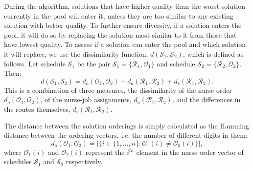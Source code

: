 \documentclass[a4paper,11pt,authoryear]{elsarticle}
\begin{document}
During the algorithm, solutions that have higher quality than the worst solution currently in the pool will enter it, unless they are too similar to any existing solution with better quality. To further ensure diversity, if a solution enters the pool, it will do so by replacing the solution most similar to it from those that have lowest quality. To assess if a solution can enter the pool and which solution it will replace, we use the dissimilarity function, $d(\mathcal{S}_1, \mathcal{S}_2)$, which is defined as follows. Let schedule $\mathcal{S}_1$ be the pair $\mathcal{S}_1 = \{\mathcal{R}_1, \mathcal{O}_1\}$ and schedule $\mathcal{S}_2 = \{\mathcal{R}_2, \mathcal{O}_2\}$. Then:
\begin{equation}
    d(\mathcal{S}_1, \mathcal{S}_2) = d_o(\mathcal{O}_1, \mathcal{O}_2) + d_a(\mathcal{R}_1, \mathcal{R}_2) + d_r(\mathcal{R}_1, \mathcal{R}_2). \label{eq:dissimilarityfunction}
\end{equation}
This is a combination of three measures, the dissimilarity of the nurse order $d_o(\mathcal{O}_1, \mathcal{O}_2)$, of the nurse-job assignments, $d_a(\mathcal{R}_1, \mathcal{R}_2)$, and the differences in the routes themselves, $d_r(\mathcal{R}_1, \mathcal{R}_2)$.

The distance between the solution orderings is simply calculated as the Hamming distance between the ordering vectors, i.e. the number of different digits in them:
\begin{equation}
    d_o(\mathcal{O}_1, \mathcal{O}_2) = |\{i\in\{1,\dots,n\} : \mathcal{O}_1(i) \neq  \mathcal{O}_2(i)\}|, \label{eq:dissimilaritynurseorder}
\end{equation}
where $\mathcal{O}_1(i)$ and $\mathcal{O}_2(i)$ represent the $i^{th}$ element in the nurse order vector of schedules $\mathcal{S}_1$ and $\mathcal{S}_2$ respectively.
\end{document}
